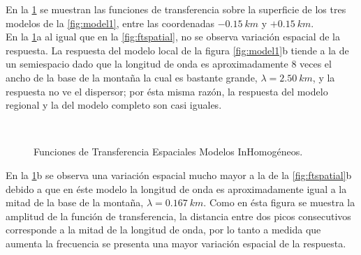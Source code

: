 \documentclass[spanish,letterpaper,12pt,twoside,openany]{article}
\begin{document}
En la \cref{fig:ftspatialIn} se muestran las funciones de transferencia sobre la superficie de los tres modelos de la \cref{fig:model1}, entre las coordenadas $-0.15\ km$ y $+0.15\ km$.\\
%
En la \cref{fig:ftspatialIn}a al igual que en la \cref{fig:ftspatial}, no se observa variación espacial de la respuesta. La respuesta del modelo local de la figura \ref{fig:model1}b tiende a la de un semiespacio dado que la longitud de onda es aproximadamente $8$ veces el ancho de la base de la montaña la cual es bastante grande, $\lambda= 2.50\ km$, y la respuesta no ve el dispersor; por ésta misma razón, la respuesta del modelo regional y la del modelo completo son casi iguales.
%
\begin{figure}[H]
	\centering
	\\
	\vspace{-.5 cm}
    \caption{Funciones de Transferencia Espaciales Modelos InHomogéneos.}
    \label{fig:ftspatialIn}
    \vspace{-1 cm}
\end{figure}
%
En la \cref{fig:ftspatialIn}b se observa una variación espacial mucho mayor a la de la \cref{fig:ftspatial}b debido a que en éste modelo la longitud de onda es aproximadamente igual a la mitad de la base de la montaña, $\lambda = 0.167\ km$. Como en ésta figura se muestra la amplitud de la función de transferencia, la distancia entre dos picos consecutivos corresponde a la mitad de la longitud de onda, por lo tanto a medida que aumenta la frecuencia se presenta una mayor variación espacial de la respuesta.
\end{document}
